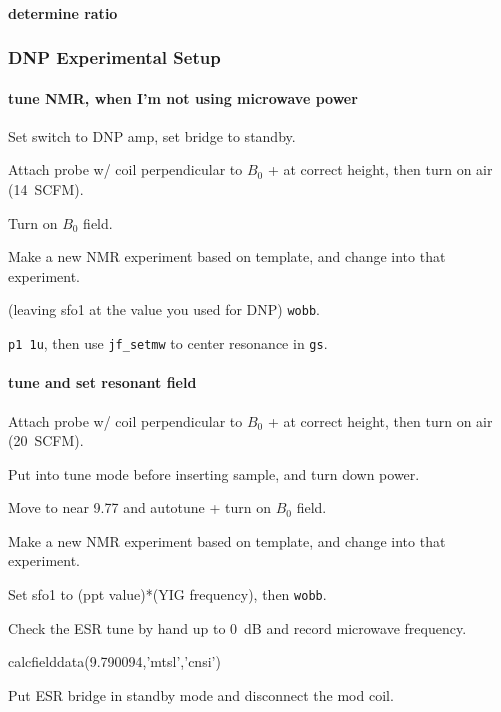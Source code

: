 \paragraph{determine ratio}
\subsubsection{DNP Experimental Setup}

\paragraph{tune NMR, when I'm not using microwave power}
Set switch to DNP amp, set bridge to standby.

Attach probe w/ coil perpendicular to $B_0$ + at correct height, then turn on air (14~SCFM).

Turn on $B_0$ field.

Make a new NMR experiment based on template, and change into that experiment.

(leaving sfo1 at the value you used for DNP) \texttt{wobb}. 

\texttt{p1 1u}, then use \texttt{jf\_setmw} to center resonance in \texttt{gs}.

\paragraph{tune and set resonant field}
Attach probe w/ coil perpendicular to $B_0$ + at correct height, then turn on air (20~SCFM).

Put into tune mode before inserting sample, and turn down power.

Move to near 9.77 and autotune + turn on $B_0$ field.

Make a new NMR experiment based on template, and change into that experiment.


Set sfo1 to (ppt value)*(YIG frequency), then \texttt{wobb}. 

Check the ESR tune by hand up to 0~dB and record microwave frequency.
\begin{python}[off]
calcfielddata(9.790094,'mtsl','cnsi')
\end{python}
Put ESR bridge in standby mode and disconnect the mod coil.

